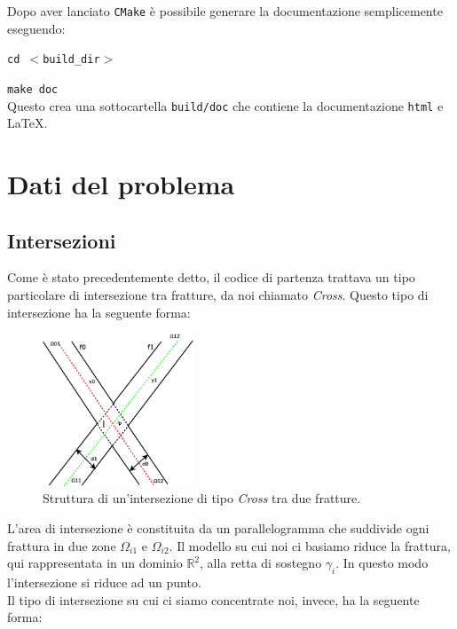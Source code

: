 \noindent Dopo aver lanciato \texttt{CMake} è possibile generare la documentazione semplicemente eseguendo: \\
\par \texttt{cd $<$build\_dir$>$} 
\par \texttt{make doc} \\

\noindent Questo crea una sottocartella \texttt{build/doc} che contiene la documentazione \texttt{html} e \LaTeX{}.

\newpage

\section{Dati del problema}

\subsection{Intersezioni}
Come è stato precedentemente detto, il codice di partenza trattava un tipo particolare di intersezione tra fratture, da noi chiamato \textit{Cross}. Questo tipo di intersezione ha la seguente forma:

\begin{figure}[htbp]
\begin{center}
\includegraphics[width=0.4\textwidth]{img/cross.eps}
\caption{Struttura di un'intersezione di tipo \textit{Cross} tra due fratture.}\label{Cross}
\end{center}
\end{figure}

\noindent L'area di intersezione è constituita da un parallelogramma che suddivide ogni frattura in due zone $\Omega_{i1}$ e $\Omega_{i2}$. Il modello su cui noi ci basiamo riduce la frattura, qui rappresentata in un dominio $\mathbb{R}^{2}$, alla retta di sostegno $\gamma_i$. In questo modo l'intersezione si riduce ad un punto.\\
Il tipo di intersezione su cui ci siamo concentrate noi, invece, ha la seguente forma:


